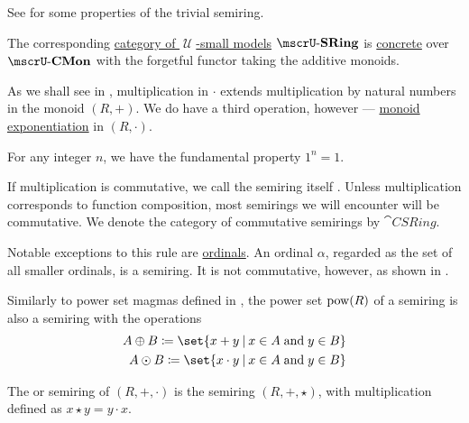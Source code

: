 \begin{definition}
\begin{thmenum}
    See  for some properties of the trivial semiring.

     The corresponding \hyperref[def:category_of_small_first_order_models]{category of \( \mscrU \)-small models} \( \ucat{SRing} \) is \hyperref[def:concrete_category]{concrete} over \hyperref[def:monoid]{\( \ucat{CMon} \)} with the forgetful functor taking the additive monoids.

     As we shall see in , multiplication in \( \cdot \) extends multiplication by natural numbers in the monoid \( (R, +) \). We do have a third operation, however --- \hyperref[def:monoid/exponentiation]{monoid exponentiation} in \( (R, \cdot) \).

    For any integer \( n \), we have the fundamental property \( 1^n = 1 \).

     If multiplication is commutative, we call the semiring itself . Unless multiplication corresponds to function composition, most semirings we will encounter will be commutative. We denote the category of commutative semirings by \( \cat{CSRing} \).

    Notable exceptions to this rule are \hyperref[def:ordinal]{ordinals}. An ordinal \( \alpha \), regarded as the set of all smaller ordinals, is a semiring. It is not commutative, however, as shown in .

     Similarly to power set magmas defined in , the power set \( \operatorname{pow}(R) \) of a semiring is also a semiring with the operations
    \begin{align*}
      A \oplus B \coloneqq \set{ x + y \given x \in A \T{and} y \in B } \\
      A \odot B \coloneqq \set{ x \cdot y \given x \in A \T{and} y \in B }
    \end{align*}

     The  or  semiring of \( (R, +, \cdot) \) is the semiring \( (R, +, \star) \), with multiplication defined as \( x \star y = y \cdot x \).
  \end{thmenum}
\end{definition}


